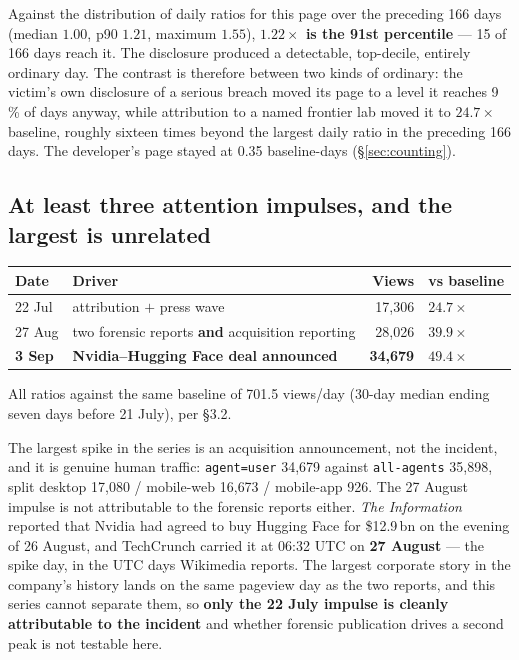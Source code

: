 \documentclass[11pt,a4paper]{article}
\begin{document}
Against the distribution of daily ratios for this page over the preceding 166
days (median $1.00$, p90 $1.21$, maximum $1.55$), \textbf{$1.22\times$ is the
91st percentile} --- 15 of 166 days reach it. The disclosure produced a
detectable, top-decile, entirely ordinary day. The contrast is therefore between
two kinds of ordinary: the victim's own disclosure of a serious breach moved its
page to a level it reaches 9\,\% of days anyway, while attribution to a named
frontier lab moved it to $24.7\times$ baseline, roughly sixteen times beyond the
largest daily ratio in the preceding 166 days. The developer's page stayed at
0.35 baseline-days (§\ref{sec:counting}).

\subsection{At least three attention impulses, and the largest is unrelated}
\label{sec:impulses}

\begin{center}
\small
\begin{tabular}{llrl}
\toprule
Date & Driver & Views & vs baseline \\\midrule
22 Jul & attribution $+$ press wave & 17{,}306 & $24.7\times$ \\
27 Aug & two forensic reports \textbf{and} acquisition reporting & 28{,}026 & $39.9\times$ \\
\textbf{3 Sep} & \textbf{Nvidia--Hugging Face deal announced} & \textbf{34{,}679} & $\mathbf{49.4\times}$ \\
\bottomrule
\end{tabular}

\smallskip
\noindent\footnotesize All ratios against the same baseline of 701.5 views/day
(30-day median ending seven days before 21 July), per §3.2.
\end{center}

The largest spike in the series is an acquisition announcement, not the
incident, and it is genuine human traffic: \texttt{agent=user} 34{,}679 against
\texttt{all-agents} 35{,}898, split desktop 17{,}080 / mobile-web 16{,}673 /
mobile-app 926. The 27 August impulse is not attributable to the forensic
reports either. \emph{The Information} reported that Nvidia had agreed to buy
Hugging Face for \$12.9\,bn on the evening of 26 August, and TechCrunch carried
it at 06:32 UTC on \textbf{27 August} --- the spike day, in the UTC days
Wikimedia reports. The largest corporate story in the company's history lands on
the same pageview day as the two reports, and this series cannot separate them,
so \textbf{only the 22 July impulse is cleanly attributable to the incident} and
whether forensic publication drives a second peak is not testable here.
\end{document}
